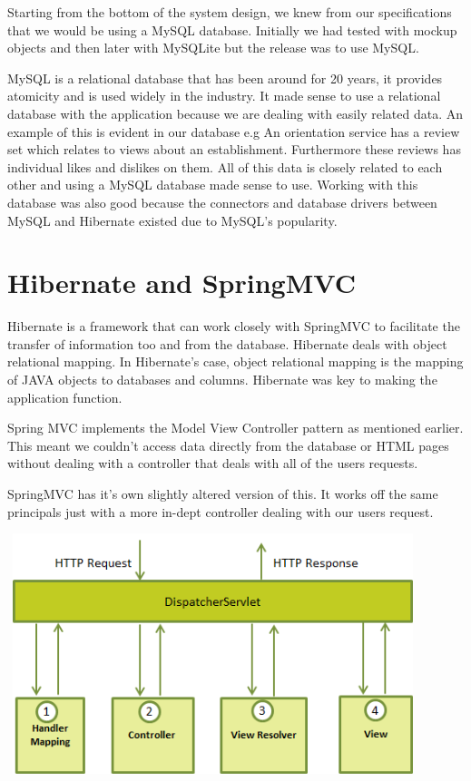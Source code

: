 Starting from the bottom of the system design, we knew from our specifications that we would be using a MySQL database. Initially we had tested with mockup objects and then later with MySQLite but the release was to use MySQL. 

MySQL is a relational database that has been around for 20 years, it provides atomicity and is used widely in the industry. It made sense to use a relational database with the application because we are dealing with easily related data. An example of this is evident in our database e.g An orientation service has a review set which relates to views about an establishment. Furthermore these reviews has individual likes and dislikes on them. All of this data is closely related to each other and using a MySQL database made sense to use. Working with this database was also good because the connectors and database drivers between MySQL and Hibernate existed due to MySQL's popularity.

\section{Hibernate and SpringMVC}

Hibernate is a framework that can work closely with SpringMVC to facilitate the transfer of information too and from the database. Hibernate deals with object relational mapping. In Hibernate's case, object relational mapping is the mapping of JAVA objects to databases and columns. Hibernate was key to making the application function.   





Spring MVC implements the Model View Controller pattern as mentioned earlier. This meant we couldn't access data directly from the database or HTML pages without dealing with a controller that deals with all of the users requests.

SpringMVC has it's own slightly altered version of this. It works off the same principals just with a more in-dept controller dealing with our users request.

\begin{center}    
	\includegraphics[height=7cm, width=12cm]{img/springmvc.png}
\end{center}

